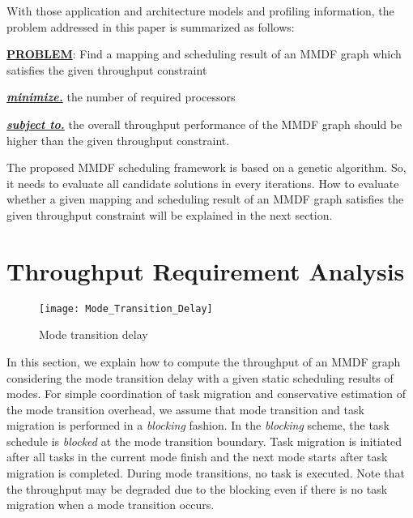 \documentclass[prodmode,acmtecs]{acmsmall}
\begin{document}
With those application and architecture models and profiling information, the problem addressed in this paper is summarized as follows:

\vspace{0.3cm}

\textbf{\underline{PROBLEM}}: Find a mapping and scheduling result of an MMDF graph which satisfies the given throughput constraint

\vspace{0.2cm}

\textbf{\textit{\underline{minimize.}}} the number of required processors

\vspace{0.2cm}

\textbf{\textit{\underline{subject to.}}} the overall throughput performance of the MMDF graph should be higher than the given throughput constraint.

\vspace{0.3cm}

The proposed MMDF scheduling framework is based on a genetic algorithm. So, it needs to evaluate all candidate solutions in every iterations. How to evaluate whether a given mapping and scheduling result of an MMDF graph satisfies the given throughput constraint will be explained in the next section.

\section{Throughput Requirement Analysis}
\label{Section:Throughput Requirement Analysis}

\begin{figure} [ht]
\centerline{\texttt{[image: Mode\_Transition\_Delay]}}
\caption{Mode transition delay}
\label{Figure:Mode Transition Delay}
\end{figure}

In this section, we explain how to compute the throughput of an MMDF graph considering the mode transition delay with a given static scheduling results of modes. For simple coordination of task migration and conservative estimation of the mode transition overhead, we assume that mode transition and task migration is performed in a \textit{blocking} fashion. In the \textit{blocking} scheme, the task schedule is \textit{blocked} at the mode transition boundary. Task migration is initiated after all tasks in the current mode finish and the next mode starts after task migration is completed. During mode transitions, no task is executed. Note that the throughput may be degraded due to the blocking even if there is no task migration when a mode transition occurs.
\end{document}
